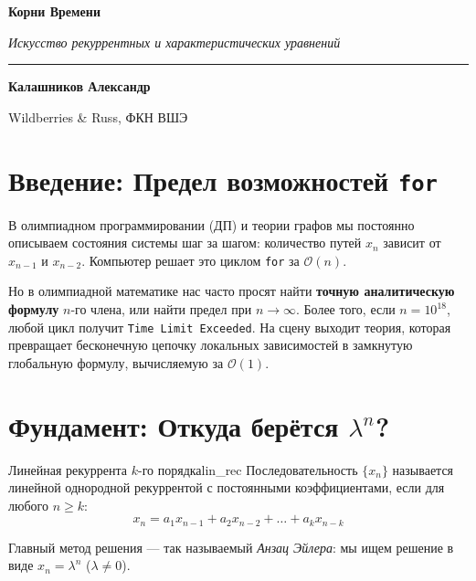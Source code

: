 \documentclass[12pt,a4paper]{article}
\renewcommand{\ge}{\geqslant}
\begin{document}
\begin{center}
    \vspace*{1.0cm}
    {\Huge \bfseries Корни Времени\par}
    \vspace{0.4cm}
    {\Large \itshape Искусство рекуррентных и характеристических уравнений\par}
    \vspace{0.6cm}
    \rule{0.6\textwidth}{1pt}\par
    \vspace{0.6cm}
    {\large \textbf{Калашников Александр}}\par
    \vspace{0.2cm}
    {\small Wildberries \& Russ, ФКН ВШЭ}
    \vspace{1.0cm}
\end{center}

\tableofcontents
\newpage

\section{Введение: Предел возможностей \texttt{for}}

В олимпиадном программировании (ДП) и теории графов мы постоянно описываем состояния системы шаг за шагом: количество путей $x_n$ зависит от $x_{n-1}$ и $x_{n-2}$. Компьютер решает это циклом \texttt{for} за $\mathcal{O}(n)$. 

Но в олимпиадной математике нас часто просят найти \textbf{точную аналитическую формулу} $n$-го члена, или найти предел при $n \to \infty$. Более того, если $n = 10^{18}$, любой цикл получит \texttt{Time Limit Exceeded}. На сцену выходит теория, которая превращает бесконечную цепочку локальных зависимостей в замкнутую глобальную формулу, вычисляемую за $\mathcal{O}(1)$.

\section{Фундамент: Откуда берётся $\lambda^n$?}

\begin{definition}{Линейная рекуррента $k$-го порядка}{lin_rec}
Последовательность $\{x_n\}$ называется линейной однородной рекуррентой с постоянными коэффициентами, если для любого $n \ge k$:
\[ x_n = a_1 x_{n-1} + a_2 x_{n-2} + \dots + a_k x_{n-k} \]
\end{definition}

Главный метод решения — так называемый \textit{Анзац Эйлера}: мы ищем решение в виде $x_n = \lambda^n$ ($\lambda \neq 0$).
\end{document}

